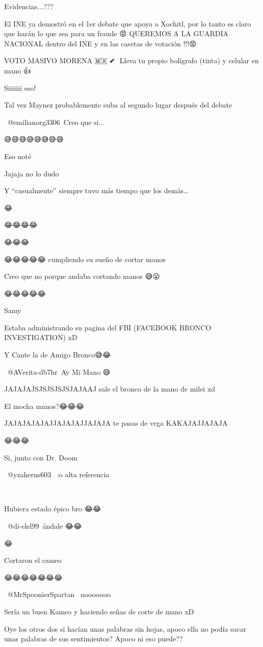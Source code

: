 Evidencias...???

El INE ya demostró en el 1er debate que apoya  a Xochitl, por lo tanto es claro que harán lo que sea para un fraude 😡 
QUEREMOS A LA GUARDIA NACIONAL dentro del INE y en las casetas de votación !!!😡👊 

VOTO MASIVO MORENA 🇲🇽💯✔💖
Lleva tu propio bolígrafo (tinta) y celular 
en mano 👍

Siiiiiii eso!

Tal vez Maynez probablemente suba al segundo lugar después del debate

​ @emilianorg3306 Creo que si...

😅😅😅😅😅😅😅😅

Eso noté

Jajaja no lo dudo

Y “casualmente” siempre tuvo más tiempo que los demás…

😂

😂😂😂😂

😂😂😂

😂😂😂😂😂 cumpliendo su sueño de cortar manos

Creo que no porque andaba cortando manos 😅😮

😂😂😂😂😂

Samy

Estaba administrando su pagina del FBI (FACEBOOK BRONCO INVESTIGATION) xD

Y Cante la de Amigo Bronco😅😂

​ @AVerita-db7hr Ay Mi Mano 😅

JAJAJAJSJSJSJSJSJAJAAJ sale el bronco de la mano de milei xd

El mocha manos?😂😂😂

JAJAJAJAJAJJAJAJAJJAJAJA te pasas de vrga KAKAJAJJAJAJA

😂😂😂

Si, junto con Dr. Doom

 @yzaherns603  :o alta referencia

🤣🤣🤣

Hubiera estado épico bro 😂😂

​ @di-elel99 ándale 😂😂

😂

Cortaron el cameo

😂😂😂😂😂😂😂

 @MrSpoonierSpartan  nooooooo

Sería un buen Kameo y haciendo señas de corte de mano xD

Oye los otros dos si hacían unas palabras sin hojas, apoco ella no podía sacar unas palabras de sus sentimientos? Apoco ni eso puede??

